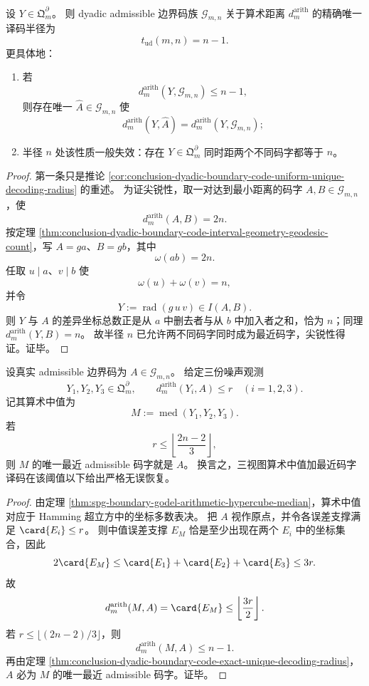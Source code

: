 \begin{theorem}\label{thm:conclusion-dyadic-boundary-code-exact-unique-decoding-radius}
设 \(Y\in \mathfrak Q_m^\partial\)。
则 dyadic admissible 边界码族 \(\mathcal G_{m,n}\) 关于算术距离 \(d_m^{\mathrm{arith}}\) 的精确唯一译码半径为
\[
t_{\mathrm{ud}}(m,n)=n-1.
\]
更具体地：
\begin{enumerate}
  \item 若
  \[
  d_m^{\mathrm{arith}}(Y,\mathcal G_{m,n})\le n-1,
  \]
  则存在唯一 \(\widehat A\in \mathcal G_{m,n}\) 使
  \[
  d_m^{\mathrm{arith}}(Y,\widehat A)=d_m^{\mathrm{arith}}(Y,\mathcal G_{m,n});
  \]
  \item 半径 \(n\) 处该性质一般失效：存在 \(Y\in \mathfrak Q_m^\partial\) 同时距两个不同码字都等于 \(n\)。
\end{enumerate}
\end{theorem}
\begin{proof}
第一条只是推论 \ref{cor:conclusion-dyadic-boundary-code-uniform-unique-decoding-radius} 的重述。
为证尖锐性，取一对达到最小距离的码字 \(A,B\in \mathcal G_{m,n}\)，使
\[
d_m^{\mathrm{arith}}(A,B)=2n.
\]
按定理 \ref{thm:conclusion-dyadic-boundary-code-interval-geometry-geodesic-count}，写 \(A=ga\)、\(B=gb\)，其中
\[
\omega(ab)=2n.
\]
任取 \(u\mid a\)、\(v\mid b\) 使
\[
\omega(u)+\omega(v)=n,
\]
并令
\[
Y:=\operatorname{rad}(g\,u\,v)\in I(A,B).
\]
则 \(Y\) 与 \(A\) 的差异坐标总数正是从 \(a\) 中删去者与从 \(b\) 中加入者之和，恰为 \(n\)；同理 \(d_m^{\mathrm{arith}}(Y,B)=n\)。
故半径 \(n\) 已允许两不同码字同时成为最近码字，尖锐性得证。证毕。
\end{proof}

\begin{corollary}[三视图算术中值去噪的精确容错阈值]\label{cor:conclusion-dyadic-boundary-code-threeview-median-denoising-threshold}
设真实 admissible 边界码为 \(A\in \mathcal G_{m,n}\)。
给定三份噪声观测
\[
Y_1,Y_2,Y_3\in \mathfrak Q_m^\partial,
\qquad
d_m^{\mathrm{arith}}(Y_i,A)\le r
\quad(i=1,2,3).
\]
记其算术中值为
\[
M:=\operatorname{med}(Y_1,Y_2,Y_3).
\]
若
\[
r\le \left\lfloor \frac{2n-2}{3}\right\rfloor,
\]
则 \(M\) 的唯一最近 admissible 码字就是 \(A\)。
换言之，三视图算术中值加最近码字译码在该阈值以下给出严格无误恢复。
\end{corollary}
\begin{proof}
由定理 \ref{thm:spg-boundary-godel-arithmetic-hypercube-median}，算术中值对应于 Hamming 超立方中的坐标多数表决。
把 \(A\) 视作原点，并令各误差支撑满足 \(\card{E_i}\le r\)。
则中值误差支撑 \(E_M\) 恰是至少出现在两个 \(E_i\) 中的坐标集合，因此
\[
2\card{E_M}\le \card{E_1}+\card{E_2}+\card{E_3}\le 3r.
\]
故
\[
d_m^{\mathrm{arith}}(M,A)=\card{E_M}\le \left\lfloor \frac{3r}{2}\right\rfloor.
\]
若 \(r\le \lfloor(2n-2)/3\rfloor\)，则
\[
d_m^{\mathrm{arith}}(M,A)\le n-1.
\]
再由定理 \ref{thm:conclusion-dyadic-boundary-code-exact-unique-decoding-radius}，\(A\) 必为 \(M\) 的唯一最近 admissible 码字。证毕。
\end{proof}


